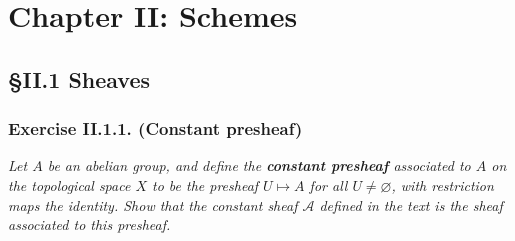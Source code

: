 \documentclass{article}
\begin{document}



\newpage
\section*{Chapter II: Schemes \\}



\subsection*{\S II.1 Sheaves \\}



\subsubsection*{Exercise II.1.1. (Constant presheaf)}
\emph{Let $A$ be an abelian group, and define the \textbf{constant presheaf}
associated to $A$ on the topological space $X$ to be
the presheaf $U \mapsto A$ for all $U \neq \varnothing$,
with restriction maps the identity.
Show that the constant sheaf $\mathscr{A}$ defined in the text is
the sheaf associated to this presheaf.} \\
\end{document}
